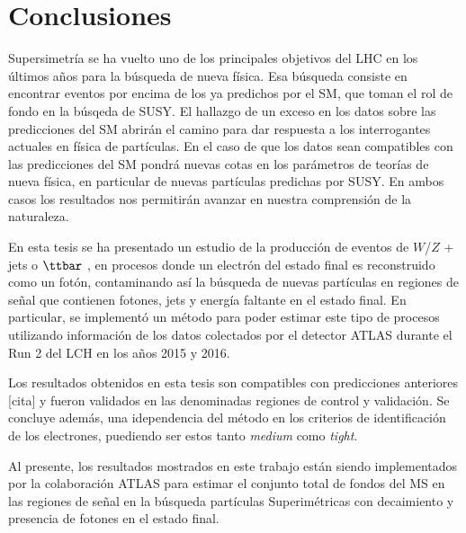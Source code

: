 \chapter{Conclusiones}

Supersimetría se ha vuelto uno de los principales objetivos del LHC en los últimos años para la búsqueda de nueva física. Esa búsqueda consiste en encontrar eventos por encima de los ya predichos por el SM, que toman el rol de fondo en la búsqeda de SUSY. El hallazgo de un exceso en los datos sobre las predicciones del SM abrirán el camino para dar respuesta a los interrogantes actuales en física de partículas. En el caso de que los datos sean compatibles con las predicciones del SM pondrá nuevas cotas en los parámetros de teorías de nueva física, en particular de nuevas partículas predichas por SUSY. En ambos casos los resultados nos permitirán avanzar en nuestra comprensión de la naturaleza. 

En esta tesis se ha presentado un estudio de la producción de eventos de $W$/$Z$ + jets o $\ttbar$ , en procesos donde un electrón del estado final es reconstruido como un fotón, contaminando así la búsqueda de nuevas partículas en regiones de señal que contienen fotones, jets y energía faltante en el estado final. En particular, se implementó un método para poder estimar este tipo de procesos utilizando información de los datos colectados por el detector ATLAS durante el Run 2 del LCH en los años 2015 y 2016.

Los resultados obtenidos en esta tesis son compatibles con predicciones anteriores [cita]  y fueron validados en las denominadas regiones de control y validación. Se concluye además, una idependencia del método en los criterios de identificación de los electrones, puediendo ser estos tanto \textit{medium} como \textit{tight}.

Al presente, los resultados mostrados en este trabajo están siendo implementados por la colaboración ATLAS para estimar el conjunto total de fondos del MS en las regiones de señal en la búsqueda partículas Superimétricas con decaimiento y presencia de fotones en el estado final.
